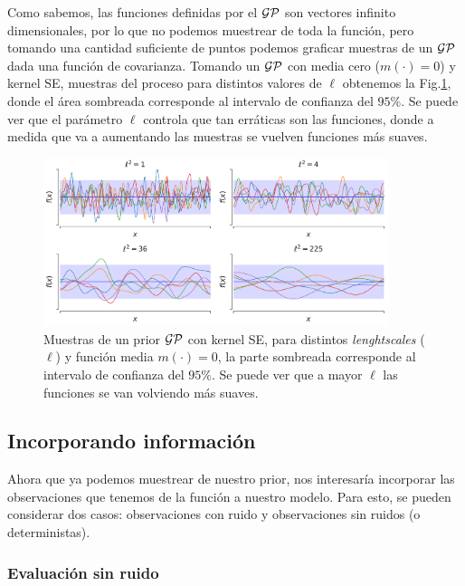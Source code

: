 Como sabemos, las funciones definidas por el $\mathcal{GP}$ son vectores infinito dimensionales, por lo que no podemos muestrear de toda la función, pero tomando una cantidad suficiente de puntos podemos graficar muestras de un $\mathcal{GP}$ dada una función de covarianza. Tomando un $\mathcal{GP}$ con media cero ($m(\cdot)=0$) y kernel SE, muestras del proceso para distintos valores de $\ell$ obtenemos la Fig.\ref{fig:gp_1}, donde el área sombreada corresponde al intervalo de confianza del $95\%$. Se puede ver que el parámetro $\ell$ controla que tan erráticas son las funciones, donde a medida que va a aumentando las muestras se vuelven funciones más suaves.

\begin{figure}[H]
	\centering
	\includegraphics[width=0.9\textwidth]{img/cap8_prior_muestras}
	\caption{Muestras de un prior $\mathcal{GP}$ con kernel SE, para distintos \textit{lenghtscales} ($\ell$) y función media $m(\cdot)=0$, la parte sombreada corresponde al intervalo de confianza del $95\%$. Se puede ver que a mayor $\ell$ las funciones se van volviendo más suaves.}
	\label{fig:gp_1}
\end{figure}

\subsection{Incorporando información}

Ahora que ya podemos muestrear de nuestro prior, nos interesaría incorporar las observaciones que tenemos de la función a nuestro modelo. Para esto, se pueden considerar dos casos: observaciones con ruido y observaciones sin ruidos (o deterministas).

\subsubsection{Evaluación sin ruido}

